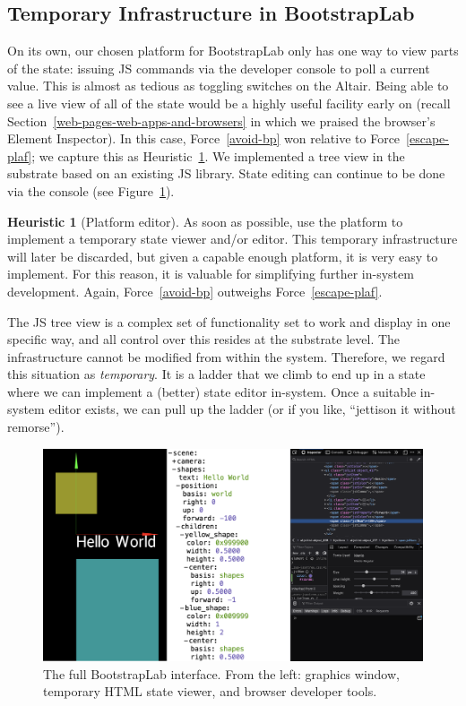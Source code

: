 \documentclass[ twoside,openright,titlepage,numbers=noenddot,headinclude,footinclude,cleardoublepage=empty,abstract=on,
                BCOR=5mm,paper=a4,fontsize=11pt
                ]{scrreprt}
\theoremstyle{definition}
\newtheorem{heuristic}{Heuristic}
\begin{document}
\hypertarget{temporary-infrastructure-in-bootstraplab}{\subsection{Temporary Infrastructure in
BootstrapLab}\label{temporary-infrastructure-in-bootstraplab}}

On its own, our chosen platform for BootstrapLab only has one way to
view parts of the state: issuing \ac{JS} commands via the developer
console to poll a current value. This is almost as tedious as toggling
switches on the Altair. Being able to see a live view of all of the
state would be a highly useful facility early on (recall
Section~\ref{web-pages-web-apps-and-browsers} in which we praised the
browser's Element Inspector). In this case, Force~\ref{avoid-bp} won
relative to Force~\ref{escape-plaf}; we capture this as
Heuristic~\ref{plaf-ed}. We implemented a tree view in the substrate
based on an existing \ac{JS} library. State editing can continue to be
done via the console (see Figure~\ref{fig:three-cols}).

\begin{heuristic}[Platform editor]
\label{plaf-ed}
As soon as possible, use the platform to implement a temporary state viewer and/or editor. This temporary infrastructure will later be discarded, but given a capable enough platform, it is very easy to implement. For this reason, it is valuable for simplifying further in-system development. Again, Force\ \ref{avoid-bp} outweighs Force\ \ref{escape-plaf}.
\end{heuristic}

The \ac{JS} tree view is a complex set of functionality set to work and
display in one specific way, and all control over this resides at the
substrate level. The infrastructure cannot be modified from within the
system. Therefore, we regard this situation as \emph{temporary}. It is a
ladder that we climb to end up in a state where we can implement a
(better) state editor in-system. Once a suitable in-system editor
exists, we can pull up the ladder (or if you like, ``jettison it without
remorse'').

\begin{figure}
\centering
\includegraphics[width=\linewidth]{three-columns.png}
\caption[BootstrapLab interface]{The full BootstrapLab interface. From the left: graphics window, temporary HTML state viewer, and browser developer tools.}
\label{fig:three-cols}
\end{figure}
\end{document}
